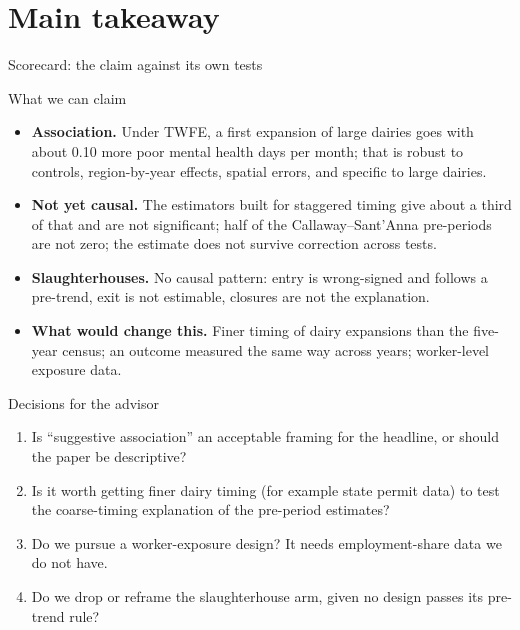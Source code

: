 \documentclass[aspectratio=169]{beamer}
\begin{document}
\section{Main takeaway}

\begin{frame}{Scorecard: the claim against its own tests}

\end{frame}

\begin{frame}{What we can claim}
\begin{itemize}\setlength\itemsep{7pt}
  \item \textbf{Association.} Under TWFE, a first expansion of large dairies goes with about 0.10 more poor mental health days per month; that is robust to controls, region-by-year effects, spatial errors, and specific to large dairies.
  \item \textbf{Not yet causal.} The estimators built for staggered timing give about a third of that and are not significant; half of the Callaway--Sant'Anna pre-periods are not zero; the estimate does not survive correction across tests.
  \item \textbf{Slaughterhouses.} No causal pattern: entry is wrong-signed and follows a pre-trend, exit is not estimable, closures are not the explanation.
  \item \textbf{What would change this.} Finer timing of dairy expansions than the five-year census; an outcome measured the same way across years; worker-level exposure data.
\end{itemize}
\end{frame}

\begin{frame}{Decisions for the advisor}
\begin{enumerate}\setlength\itemsep{8pt}
  \item Is ``suggestive association'' an acceptable framing for the headline, or should the paper be descriptive?
  \item Is it worth getting finer dairy timing (for example state permit data) to test the coarse-timing explanation of the pre-period estimates?
  \item Do we pursue a worker-exposure design? It needs employment-share data we do not have.
  \item Do we drop or reframe the slaughterhouse arm, given no design passes its pre-trend rule?
\end{enumerate}
\end{frame}
\end{document}
